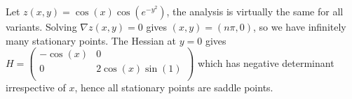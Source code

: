 \documentclass[a4paper, 11pt]{exam}
\begin{document}
\begin{questions}
    \begin{solution}
        Let $z(x,y) = \cos(x)\cos(e^{-y^2})$, the analysis is virtually the same for all variants. Solving $\nabla z(x,y) = 0$ gives $(x,y) = (n\pi, 0)$, so we have infinitely many stationary points. The Hessian at $y = 0$ gives $H = 
        \begin{pmatrix}
            -\cos(x) & 0 \\
            0 & 2\cos(x)\sin(1) \\
        \end{pmatrix}$
        which has negative determinant irrespective of $x$, hence all stationary points are saddle points.
    \end{solution}



\end{questions}
\end{document}
